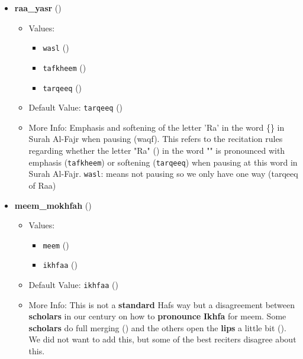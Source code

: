 \begin{itemize}
\item \textbf{raa\_yasr} ()
  \begin{itemize}
  \item Values: 
    \begin{itemize}
    \item  \texttt{wasl} ()
    \item  \texttt{tafkheem} ()
    \item  \texttt{tarqeeq} ()
    \end{itemize}
  \item Default Value: \texttt{tarqeeq} ()
  \item More Info: Emphasis and softening of the letter 'Ra' in the word \{\} in Surah Al-Fajr when pausing (waqf). This refers to the recitation rules regarding whether the letter "Ra" () in the word "" is pronounced with emphasis (\texttt{tafkheem}) or softening (\texttt{tarqeeq}) when pausing at this word in Surah Al-Fajr. \texttt{wasl}: means not pausing so we only have one way (tarqeeq of Raa)
  \end{itemize}

\item \textbf{meem\_mokhfah} ()
  \begin{itemize}
  \item Values: 
    \begin{itemize}
    \item  \texttt{meem} ()
    \item  \texttt{ikhfaa} ()
    \end{itemize}
  \item Default Value: \texttt{ikhfaa} ()
  \item More Info: This is not a \textbf{standard} Hafs way but a disagreement between \textbf{scholars} in our century on how to \textbf{pronounce} \textbf{Ikhfa} for meem. Some \textbf{scholars} do full merging () and the others open the \textbf{lips} a little bit (). We did not want to add this, but some of the best reciters disagree about this.
  \end{itemize}
\end{itemize}